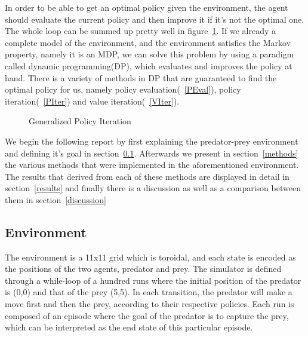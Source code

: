 \documentclass[paper=a4, fontsize=11pt]{scrartcl}
\numberwithin{equation}{section}		%
\numberwithin{figure}{section}			%
\numberwithin{table}{section}				%
\begin{document}
In order to be able to get an optimal policy given the environment, the agent should evaluate the current policy and then improve it if it's not the optimal one. The whole loop can be summed up pretty well in figure~\ref{GPI}. If we already a complete model of the environment, and the environment satisfies the Markov property, namely it is an MDP, we can solve this problem by using a paradigm called dynamic programming(DP), which evaluates and improves the policy at hand. There is a variety of methods in DP that are guaranteed to find the optimal policy for us, namely policy evaluation(~\ref{PEval}), policy iteration(~\ref{PIter}) and value iteration(~\ref{VIter}).    
\begin{figure}[H] \centering
{}
\caption{Generalized Policy Iteration} 
\label{GPI}
\end{figure}

We begin the following report by first explaining the predator-prey environment and defining it's goal in section~\ref{environment}. Afterwards we present in section~\ref{methods} the various methods that were implemented in the aforementioned environment. The results that derived from each of these methods are displayed in detail in section~\ref{results} and finally there is a discussion as well as a comparison between them in section~\ref{discussion}

\subsection{Environment}
\label{environment}
The environment is a 11x11 grid which is toroidal, and each state is encoded as the positions of the two agents, predator and prey.
The simulator is defined through a while-loop of a hundred runs where the initial position of the predator is (0,0) and that of the prey (5,5). In each transition, the predator will make a move first and then the prey, according to their respective policies. Each run is composed of an episode where the goal of the predator is to capture the prey, which can be interpreted as the end state of this particular episode. 
\end{document}
